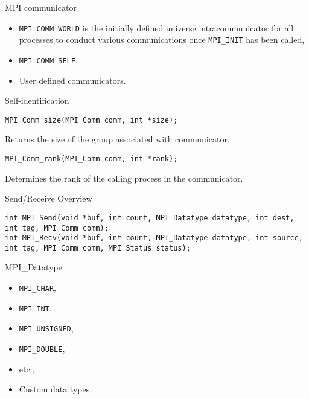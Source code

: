 \begin{frame}{MPI communicator}

\begin{itemize}
    \item \texttt{MPI_COMM_WORLD} is the initially defined universe intracommunicator for all processes to conduct various communications once \texttt{MPI_INIT} has been called,
    \item \texttt{MPI_COMM_SELF},
    \item User defined communicators.
\end{itemize}

\end{frame}

\begin{frame}[fragile]{Self-identification}

\begin{lstlisting}
MPI_Comm_size(MPI_Comm comm, int *size);
\end{lstlisting}

Returns the size of the group associated with communicator.

\vfill

\begin{lstlisting}
MPI_Comm_rank(MPI_Comm comm, int *rank);
\end{lstlisting}

Determines the rank of the calling process in the communicator.

\end{frame}

\begin{frame}[fragile]{Send/Receive Overview}

\begin{lstlisting}
int MPI_Send(void *buf, int count, MPI_Datatype datatype, int dest, int tag, MPI_Comm comm);
int MPI_Recv(void *buf, int count, MPI_Datatype datatype, int source, int tag, MPI_Comm comm, MPI_Status status);
\end{lstlisting}

\end{frame}

\begin{frame}{MPI_Datatype}

\begin{itemize}
    \item \texttt{MPI_CHAR},
    \item \texttt{MPI_INT},
    \item \texttt{MPI_UNSIGNED},
    \item \texttt{MPI_DOUBLE},
    \item etc.,
    \item Custom data types.
\end{itemize}

\end{frame}

